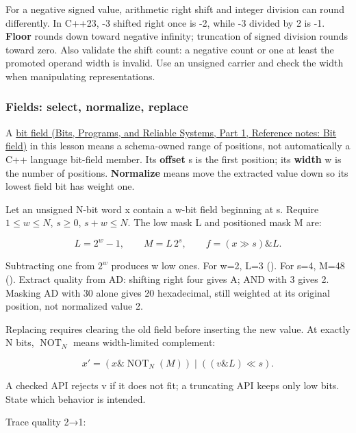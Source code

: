 For a negative signed value, arithmetic right shift and integer division can round differently. In C++23, -3 shifted right once is -2, while -3 divided by 2 is -1. \textbf{Floor} rounds down toward negative infinity; truncation of signed division rounds toward zero. Also validate the shift count: a negative count or one at least the promoted operand width is invalid. Use an unsigned carrier and check the width when manipulating representations.

\subsubsection{Fields: select, normalize, replace}\label{05-engine-i-ch001-fields-select-normalize-replace}

\hypertarget{05-engine-i-ch001-fields-select-normalize-replace}{}

A \href{../01-Bits-Programs-and-Reliable-Systems-P01/main.pdf\#nameddest=appendix-ac697f5c66e8}{bit field (Bits, Programs, and Reliable Systems, Part 1, Reference notes: Bit field)} in this lesson means a schema-owned range of positions, not automatically a C++ language bit-field member. Its \textbf{offset} s is the first position; its \textbf{width} w is the number of positions. \textbf{Normalize} means move the extracted value down so its lowest field bit has weight one.

Let an unsigned N-bit word x contain a w-bit field beginning at s. Require \(1\le w\le N\), \(s\ge0\), \(s+w\le N\). The low mask L and positioned mask M are:

\[
L=2^w-1,\qquad M=L\,2^s,\qquad f=(x\gg s)\mathbin{\&}L.
\]

Subtracting one from \(2^w\) produces w low ones. For w=2, L=3 (). For s=4, M=48 (). Extract quality from AD: shifting right four gives A; AND with 3 gives 2. Masking AD with 30 alone gives 20 hexadecimal, still weighted at its original position, not normalized value 2.

Replacing requires clearing the old field before inserting the new value. At exactly N bits, \(\operatorname{NOT}_N\) means width-limited complement:

\[
x'=(x\mathbin{\&}\operatorname{NOT}_N(M))
\mathbin{|}((v\mathbin{\&}L)\ll s).
\]

A checked API rejects v if it does not fit; a truncating API keeps only low bits. State which behavior is intended.

Trace quality 2→1:

